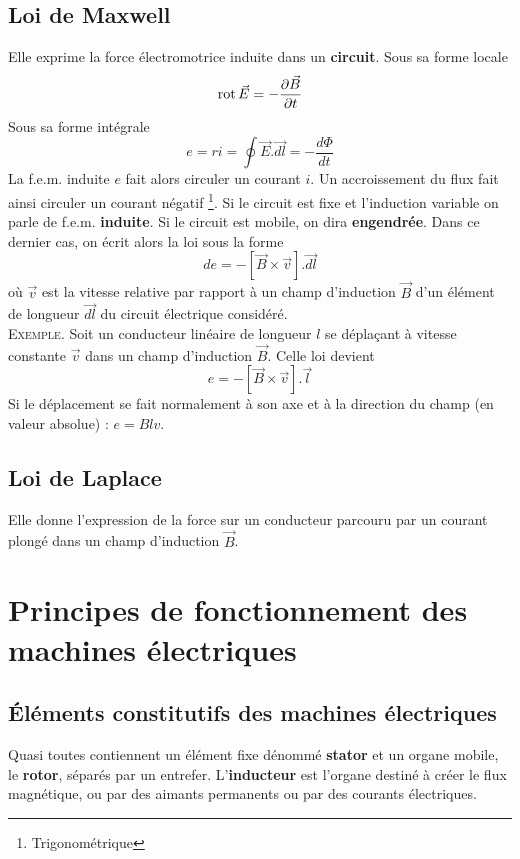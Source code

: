 	\subsection{Loi de Maxwell}
	Elle exprime la force électromotrice induite dans un \textbf{circuit}. 
	Sous sa forme locale 
	\begin{equation}
	\rot \vec{E} = -\frac{\partial \vec{B}}{\partial t}
	\end{equation}
	Sous sa forme intégrale 
	\begin{equation}
	e = ri = \oint \vec{E}.\vec{dl} = -\frac{d\Phi}{dt}
	\end{equation}
	La f.e.m. induite $e$ fait alors circuler un courant $i$. Un 
	accroissement du flux fait ainsi circuler un courant négatif
	\footnote{Trigonométrique}. Si le circuit est fixe et l'induction 
	variable on parle de f.e.m. \textbf{induite}. Si le circuit est 
	mobile, on dira \textbf{engendrée}. Dans ce dernier cas, on écrit 
	alors la loi sous la forme
	\begin{equation}
	de = -[\vec{B}\times\vec{v}].\vec{dl}
	\end{equation}
	où $\vec{v}$ est la vitesse relative par rapport à un champ d'induction 
	$\vec{B}$ d'un élément de longueur $\vec{dl}$ du circuit électrique 
	considéré.\\
	\textsc{Exemple}. Soit un conducteur linéaire de longueur $l$ se 
	déplaçant à vitesse constante $\vec{v}$ dans un champ d'induction $\vec{
	B}$. Celle loi devient 
	\begin{equation}
	e = -[\vec{B}\times\vec{v}].\vec{l}
	\end{equation}
	Si le déplacement se fait normalement à son axe et à la direction 
	du champ (en valeur absolue) : $e = Blv$.
	
	
	\subsection{Loi de Laplace}
	Elle donne l'expression de la force sur un conducteur parcouru par 
	un courant plongé dans un champ d'induction $\vec{B}$.
	
	
\section{Principes de fonctionnement des machines électriques}
	\subsection{Éléments constitutifs des machines électriques}
	Quasi toutes contiennent un élément fixe dénommé \textbf{stator} 
	et un organe mobile, le \textbf{rotor}, séparés par un entrefer. 
	L'\textbf{inducteur} est l'organe destiné à créer le flux 
	magnétique, ou par des aimants permanents ou par des courants 
	électriques.
	
